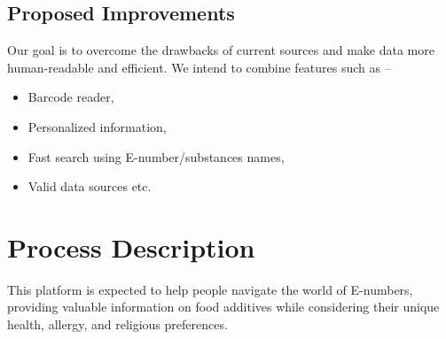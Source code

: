 \documentclass[a4paper,12pt]{report}
\begin{document}
\subsection*{Proposed Improvements}
Our goal is to overcome the drawbacks of current sources and make data more human-readable and efficient. We intend to combine features such as --
\begin{itemize}
	\item Barcode reader,
	\item Personalized information,
	\item Fast search using E-number/substances names,
	\item Valid data sources etc.
\end{itemize}

\section*{Process Description}
This platform is expected to help people navigate the world of E-numbers, providing valuable information on food additives while considering their unique health, allergy, and religious preferences.
\end{document}
